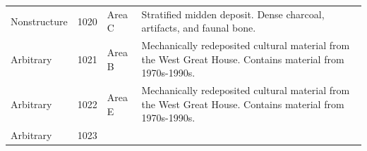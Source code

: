 \documentclass[
  12pt,
]{krantz}
\begin{document}
\begin{longtable}[]{@{}llll@{}}
\begin{minipage}[t]{0.18\columnwidth}\raggedright
Nonstructure\strut
\end{minipage} & \begin{minipage}[t]{0.11\columnwidth}\raggedright
1020\strut
\end{minipage} & \begin{minipage}[t]{0.16\columnwidth}\raggedright
Area C\strut
\end{minipage} & \begin{minipage}[t]{0.38\columnwidth}\raggedright
Stratified midden deposit.
Dense charcoal, artifacts,
and faunal bone.\strut
\end{minipage}\tabularnewline
\begin{minipage}[t]{0.18\columnwidth}\raggedright
Arbitrary\strut
\end{minipage} & \begin{minipage}[t]{0.11\columnwidth}\raggedright
1021\strut
\end{minipage} & \begin{minipage}[t]{0.16\columnwidth}\raggedright
Area B\strut
\end{minipage} & \begin{minipage}[t]{0.38\columnwidth}\raggedright
Mechanically redeposited
cultural material from the
West Great House. Contains
material from 1970s-1990s.\strut
\end{minipage}\tabularnewline
\begin{minipage}[t]{0.18\columnwidth}\raggedright
Arbitrary\strut
\end{minipage} & \begin{minipage}[t]{0.11\columnwidth}\raggedright
1022\strut
\end{minipage} & \begin{minipage}[t]{0.16\columnwidth}\raggedright
Area E\strut
\end{minipage} & \begin{minipage}[t]{0.38\columnwidth}\raggedright
Mechanically redeposited
cultural material from the
West Great House. Contains
material from 1970s-1990s.\strut
\end{minipage}\tabularnewline
\begin{minipage}[t]{0.18\columnwidth}\raggedright
Arbitrary\strut
\end{minipage} & \begin{minipage}[t]{0.11\columnwidth}\raggedright
1023\strut
\end{minipage} & \begin{minipage}[t]{0.16\columnwidth}\raggedright

\end{minipage}
\end{longtable}
\end{document}
